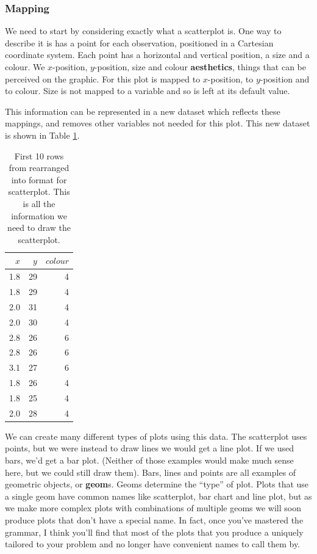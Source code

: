 \subsubsection{Mapping}

We need to start by considering exactly what a scatterplot is. One way to describe it is has a point for each observation, positioned in a Cartesian coordinate system.  Each point has a horizontal and vertical position, a size and a colour.  We $x$-position, $y$-position, size and colour {\bf aesthetics}, things that can be perceived on the graphic.  For this plot  is mapped to $x$-position,  to $y$-position and  to colour.  Size is not mapped to a variable and so is left at its default value.  

This information can be represented in a new dataset which reflects these mappings, and removes other variables not needed for this plot. This new dataset is shown in Table \ref{tbl:mapping}.


\begin{table}[ht]
  \begin{center}
  \begin{tabular}{rrr}
    \toprule
    $x$ & $y$ & $colour$\\
    \midrule
    1.8 & 29 & 4\\
    1.8 & 29 & 4\\
    2.0 & 31 & 4\\
    2.0 & 30 & 4\\
    2.8 & 26 & 6\\
    2.8 & 26 & 6\\
    3.1 & 27 & 6\\
    1.8 & 26 & 4\\
    1.8 & 25 & 4\\
    2.0 & 28 & 4\\
    \bottomrule
  \end{tabular}
  \end{center}
  \caption{First 10 rows from  rearranged into format for scatterplot.  This is all the information we need to draw the scatterplot.}
  \label{tbl:mapping}
\end{table}

We can create many different types of plots using this data.  The scatterplot uses points, but we were instead to draw lines we would get a line plot.  If we used bars, we'd get a bar plot.  (Neither of those examples would make much sense here, but we could still draw them).  Bars, lines and points are all examples of geometric objects, or {\bf geom}s.  Geoms determine the ``type'' of plot.  Plots that use a single geom have common names like scatterplot, bar chart and line plot, but as we make more complex plots with combinations of multiple geoms we will soon produce plots that don't have a special name.  In fact, once you've mastered the grammar, I think you'll find that most of the plots that you produce a uniquely tailored to your problem and no longer have convenient names to call them by.

